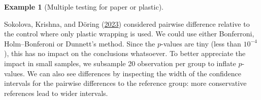 \documentclass[
  11pt,
  letterpaper,
]{scrbook}
\theoremstyle{definition}
\newtheorem{example}{Example}[chapter]
\theoremstyle{remark}
\begin{document}
\begin{example}[Multiple testing for paper or
plastic]\protect\hypertarget{exm-paperorplastic}{}\label{exm-paperorplastic}

Sokolova, Krishna, and Döring
(\protect\hyperlink{ref-Sokolova.Krishna.Doring:2023}{2023}) considered
pairwise difference relative to the control where only plastic wrapping
is used. We could use either Bonferroni, Holm--Bonferoni or Dunnett's
method. Since the \(p\)-values are tiny (less than \(10^{-4}\)), this
has no impact on the conclusions whatsoever. To better appreciate the
impact in small samples, we subsample 20 observation per group to
inflate \(p\)-values. We can also see differences by inspecting the
width of the confidence intervals for the pairwise differences to the
reference group: more conservative references lead to wider intervals.


\end{example}
\end{document}

